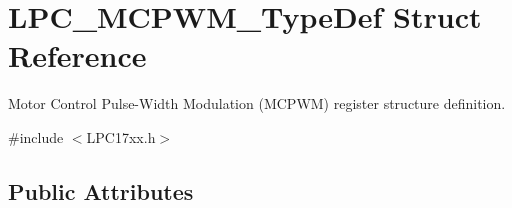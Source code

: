\hypertarget{struct_l_p_c___m_c_p_w_m___type_def}{\section{\-L\-P\-C\-\_\-\-M\-C\-P\-W\-M\-\_\-\-Type\-Def \-Struct \-Reference}
\label{struct_l_p_c___m_c_p_w_m___type_def}
}


\-Motor \-Control \-Pulse-\/\-Width \-Modulation (\-M\-C\-P\-W\-M) register structure definition.  




{\ttfamily \#include $<$\-L\-P\-C17xx.\-h$>$}

\subsection*{\-Public \-Attributes}
